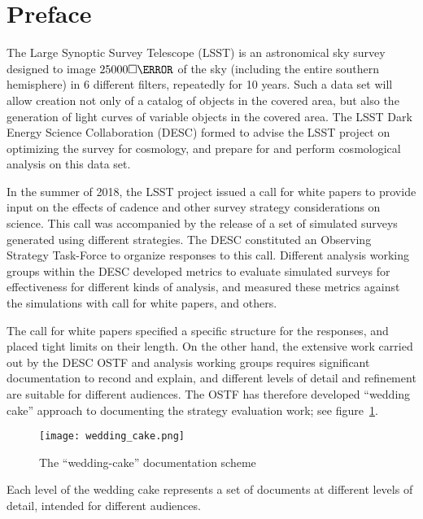 \section*{Preface}

The Large Synoptic Survey Telescope (LSST) is an astronomical sky
survey designed to image $25000\square\degree$ of the sky (including
the entire southern hemisphere) in 6 different filters, repeatedly for
10 years. Such a data set will allow creation not only of a catalog of
objects in the covered area, but also the generation of light curves
of variable objects in the covered area. The LSST Dark Energy Science
Collaboration (DESC) formed to advise the LSST project on optimizing
the survey for cosmology, and prepare for and perform cosmological
analysis on this data set.

In the summer of 2018, the LSST project issued a call for white papers
to provide input on the effects of cadence and other survey strategy
considerations on science. This call was accompanied by the release of
a set of simulated surveys generated using different strategies. The
DESC constituted an Observing Strategy Task-Force to organize
responses to this call. Different analysis working groups within the
DESC developed metrics to evaluate simulated surveys for effectiveness
for different kinds of analysis, and measured these metrics against
the simulations with call for white papers, and others.

The call for white papers specified a specific structure for the
responses, and placed tight limits on their length. On the other hand,
the extensive work carried out by the DESC OSTF and analysis working
groups requires significant documentation to recond and explain, and
different levels of detail and refinement are suitable for different
audiences. The OSTF has therefore developed ``wedding cake'' approach
to documenting the strategy evaluation work; see
figure~\ref{fig:weddingcake}.

\begin{figure}[here]
  \centering
  \texttt{[image: wedding\_cake.png]}
  \caption{The ``wedding-cake'' documentation scheme}
  \label{fig:weddingcake}
\end{figure}

Each level of the wedding cake represents a set of documents at
different levels of detail, intended for different audiences.

